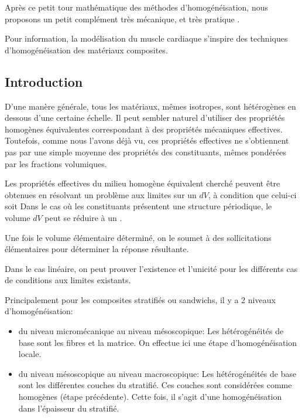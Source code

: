 Après ce petit tour \og mathématique \fg{} des méthodes d'homogénéisation,
nous proposons un petit complément très mécanique, et très \og pratique \fg{}.

\medskip
Pour information, la modélisation du muscle cardiaque s'inspire des techniques d'homogénéisation
des matériaux composites.


\medskip
\subsection{Introduction}

D'une manère générale, tous les matériaux, mêmes isotropes, sont hétérogènes
en dessous d'une certaine échelle.
Il peut sembler naturel d'utiliser des propriétés homogènes équivalentes correspondant
à des propriétés mécaniques effectives.
Toutefois, comme nous l'avons déjà vu, ces propriétés effectives ne s'obtiennent pas par 
une simple moyenne des propriétés des constituants, mêmes  pondérées par les fractions 
volumiques.

\medskip
Les propriétés effectives du milieu homogène équivalent cherché peuvent être obtenues
en résolvant un problème aux limites sur un  $dV$, à condition 
que celui-ci soit 
Dans le cas où les constituants présentent une structure périodique, le volume $dV$ peut se 
réduire à un .

\medskip
Une fois le volume élémentaire déterminé, on le soumet à des sollicitations élémentaires
pour déterminer la réponse résultante. 

\medskip
Dans le cas linéaire, on peut prouver l'existence et l'unicité pour les différents cas de
conditions aux limites existants.

\medskip
Principalement pour les composites stratifiés ou sandwichs, il y a 2 niveaux d'homogénéisation:
\begin{itemize}
	\item du niveau micromécanique au niveau mésoscopique:
		Les hétérogénéités de base sont les fibres et la matrice. On effectue ici
		 une étape d'homogénéisation locale.
	\item du niveau mésoscopique au niveau macroscopique:
		Les hétérogénéités de base sont les différentes couches du stratifié.
		 Ces couches sont considérées comme \og homogènes\fg{} (étape précédente).
		 Cette fois, il s'agit d'une homogénéisation dans l'épaisseur du stratifié.
\end{itemize}





